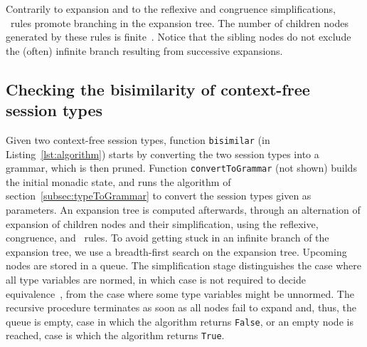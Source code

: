 Contrarily to expansion and to the reflexive and congruence
simplifications, \BPA\ rules promote branching in the expansion
tree. The number of children nodes generated by these rules is
finite~\cite{DBLP:journals/iandc/ChristensenHS95}.
%
Notice that the sibling nodes do not exclude the (often) infinite
branch resulting from successive expansions.

\subsection{Checking the bisimilarity of context-free session types}


Given two context-free session types, function \lstinline|bisimilar|
(in Listing~\ref{lst:algorithm}) starts by converting the two session
types into a grammar, which is then pruned. Function
\lstinline|convertToGrammar| (not shown) builds the initial monadic
state, and runs the algorithm of section~\ref{subsec:typeToGrammar} to
convert the session types given as parameters.
%
An expansion tree is computed afterwards, through an alternation of
expansion of children nodes and their simplification, using the
reflexive, congruence, and \BPA\ rules.
%
To avoid getting stuck in an infinite branch of the expansion tree, we
use a breadth-first search on the expansion tree. Upcoming nodes are
stored in a queue.
%
The simplification stage distinguishes the case where all type
variables are normed, in which case  is not required to decide
equivalence~\cite{caucal1986decidabilite,DBLP:journals/iandc/ChristensenHS95},
from the case where some type variables might be unnormed. The
recursive procedure terminates as soon as all nodes fail to expand
and, thus, the queue is empty, case in which the algorithm returns
\lstinline|False|, or an empty node is reached, case is which the
algorithm returns \lstinline|True|.

